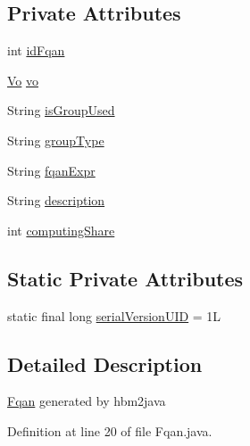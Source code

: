 \subsection*{Private Attributes}
\begin{DoxyCompactItemize}
\item 
int \hyperlink{classportal_1_1registration_1_1domain_1_1Fqan_ad84508e79770bdb6de564d288f498ac6}{idFqan}
\item 
\hyperlink{classportal_1_1registration_1_1domain_1_1Vo}{Vo} \hyperlink{classportal_1_1registration_1_1domain_1_1Fqan_a8e4e4b03f04876190df45dc42f536a83}{vo}
\item 
String \hyperlink{classportal_1_1registration_1_1domain_1_1Fqan_a18a759a4901fefe12b28418fd4fc054c}{isGroupUsed}
\item 
String \hyperlink{classportal_1_1registration_1_1domain_1_1Fqan_ab172b872fc284fb1f5c0ebb198a5c98a}{groupType}
\item 
String \hyperlink{classportal_1_1registration_1_1domain_1_1Fqan_a8fee3ab195a29cf4e56f5b7ea9226e3a}{fqanExpr}
\item 
String \hyperlink{classportal_1_1registration_1_1domain_1_1Fqan_a75b560547e2591fb42c279e8b1bcc782}{description}
\item 
int \hyperlink{classportal_1_1registration_1_1domain_1_1Fqan_a05ebf08182a037b4cbb4b27053e76ebc}{computingShare}
\end{DoxyCompactItemize}
\subsection*{Static Private Attributes}
\begin{DoxyCompactItemize}
\item 
static final long \hyperlink{classportal_1_1registration_1_1domain_1_1Fqan_a0b9b4848dc758619b3bfca40e4f6edd5}{serialVersionUID} = 1L
\end{DoxyCompactItemize}


\subsection{Detailed Description}
\hyperlink{classportal_1_1registration_1_1domain_1_1Fqan}{Fqan} generated by hbm2java 

Definition at line 20 of file Fqan.java.



